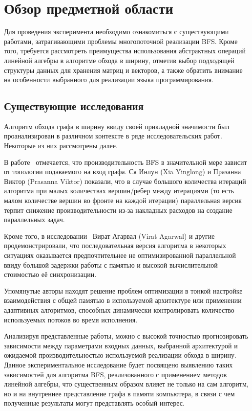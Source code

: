 
\section{Обзор предметной области}
\label{sec:relatedworks}
Для проведения эксперимента необходимо ознакомиться с существующими работами, затрагивающими проблемы многопоточной реализации BFS. Кроме того, требуется рассмотреть преимущества использования абстрактных операций линейной алгебры в алгоритме обхода в ширину, отметив выбор подходящей структуры данных для хранения матриц и векторов, а также обратить внимание на особенности выбранного для реализации языка программирования.



\subsection{Существующие исследования}
Алгоритм обхода графа в ширину ввиду своей прикладной значимости был проанализирован в различном контексте в ряде исследовательских работ. Некоторые из них рассмотрены далее.

В работе~\cite{adaptiveBFS} отмечается, что производительность BFS в значительной мере зависит от топологии подаваемого на вход графа. Ся Инлун (Xia Yinglong) и Празанна Виктор (Prasanna Viktor) показали, что в случае большого количества итераций алгоритма при малых количествах вершин/ребер между итерациями (то есть малом количестве вершин во фронте на каждой итерации) параллельная версия терпит снижение производительности из-за накладных расходов на создание параллельных задач.

Кроме того, в исследовании~\cite{scalableBFS} Вират Агарвал (Virat Agarwal) и другие продемонстрировали, что последовательная версия алгоритма в некоторых ситуациях оказывается предпочтительнее не оптимизированной параллельной ввиду большой задержки работы с памятью и высокой вычислительной стоимостью её синхронизации. 

Упомянутые авторы находят решение проблем оптимизации в тонкой настройке взаимодействия с общей памятью в используемой архитектуре или применении адаптивных алгоритмов, способных динамически контролировать количество используемых потоков во время исполнения.

Анализируя представленные работы, можно с высокой точностью прогнозировать зависимости между параметрами входных данных, выбранной архитектурой и ожидаемой производительностью используемой реализации обхода в ширину. Данное экспериментальное исследование будет посвящено выявлению таких зависимостей для алгоритма BFS, реализованного с применением методов линейной алгебры, что существенным образом влияет не только на сам алгоритм, но и на внутреннее представление графа в памяти компьютера, в связи с чем полученные результаты могут представлять особый интерес.



